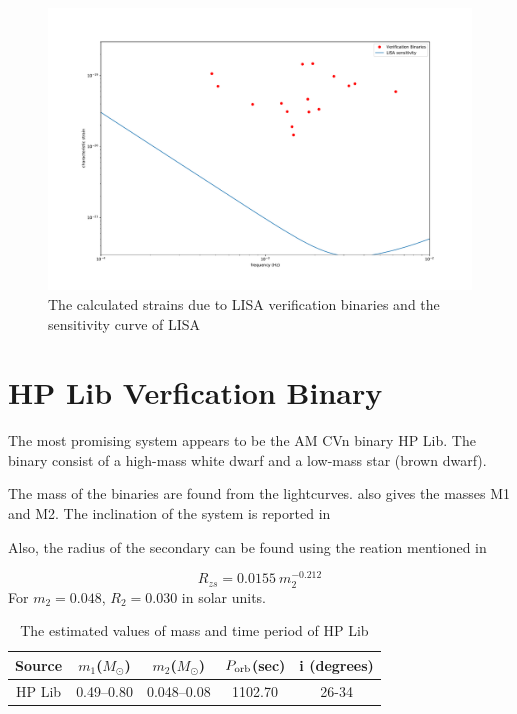 \documentclass[10pt,a4paper]{article}
\begin{document}
\begin{figure}[ht]
\centering
\includegraphics[scale=0.25]{../Figures/strain_verific_binary.pdf}
\caption{The calculated strains due to LISA verification binaries and the sensitivity curve of LISA}
\end{figure}

\section{HP Lib Verfication Binary}

The most promising system appears to be the AM CVn binary HP Lib. The binary consist of a high-mass white dwarf and a low-mass star (brown dwarf).

The mass of the binaries are found from the lightcurves. \cite{Patterson} also gives the masses M1 and M2. The inclination of the system is reported in \cite{Roelofs}


Also, the radius of the secondary can be found using the reation mentioned in \citep{Patterson}

\begin{equation}
R_{zs} = 0.0155 \ m_2^{-0.212}
\end{equation}
For $m_2 = 0.048$, $R_2 = 0.030$ in solar units.

\begin{table}[H]
\centering
\begin{tabular}{|c|c|c|c|c|}
\hline 
\rule[-1ex]{0pt}{2.5ex} Source & $m_1$($M_{\odot}$) & $m_2$($M_{\odot}$) & $P_{\rm orb}$(sec) &i (degrees) \\ 
\hline 
\rule[-1ex]{0pt}{2.5ex} HP Lib & 0.49--0.80 & 0.048--0.08 & 1102.70 & 26-34\\ 
\hline 
\end{tabular}
\caption{The estimated values of mass and time period of HP Lib}
\label{table1}
\end{table}
\end{document}
